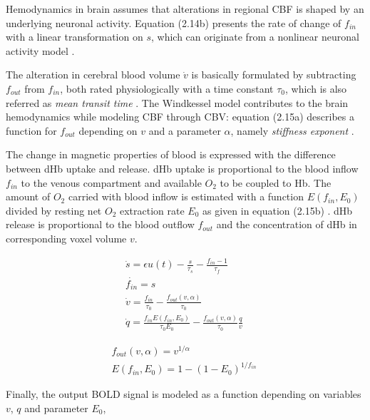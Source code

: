 Hemodynamics in brain assumes that alterations in regional CBF is shaped by an underlying neuronal activity. Equation (2.14b) presents the rate of change of $f_{in}$ with a linear transformation on $s$, which can originate from a nonlinear neuronal activity model \citep{XYZ00, XYZFR}. 

The alteration in cerebral blood volume $\dot{v}$ is basically formulated by subtracting $f_{out}$ from $f_{in}$, both rated physiologically with a time constant $\tau_0$, which is also referred as \textit{mean transit time} \citep{XYZ99}. The Windkessel model contributes to the brain hemodynamics while modeling CBF through CBV:  equation (2.15a) describes a function for $f_{out}$ depending on $v$ and a parameter $\alpha$, namely \textit{stiffness exponent} \citep{XYZ99}.    

The change in magnetic properties of blood is expressed with the difference between dHb uptake and release. dHb uptake is proportional to the blood inflow $f_{in}$ to the venous compartment and available $O_2$ to be coupled to Hb. The amount of $O_2$ carried with blood inflow is estimated with a function $E(f_{in}, E_0)$ divided by resting net $O_2$ extraction rate $E_0$ as given in equation (2.15b) \citep{XYZ98}. dHb release is proportional to the blood outflow $f_{out}$ and the concentration of dHb in corresponding voxel volume $v$.     

\begin{subequations}
 \begin{align} \dot{s} = \epsilon u(t)- \frac{s}{\tau_s} - \frac{f_{in} -1 }{\tau_f}  \label{eqn: frobenius 19}\\  \dot{f_{in}} = s
\label{eqn: frobenius 20} \\ \dot{v} = \frac{f_{in}}{\tau_0} - \frac{f_{out}(v, \alpha)}{\tau_0} 
\label{eqn: frobenius 21} \\ \dot{q} = \frac{f_{in} E(f_{in}, E_0)}{\tau_0 E_0}- \frac{f_{out}(v, \alpha)}{\tau_0}  \frac{q}{v}  
\
\end{align} 
\end{subequations}

\begin{subequations}
 \begin{align} f_{out}(v, \alpha) = v^{1/ \alpha}
 \label{eqn: frobenius 22}\\  E(f_{in} , E_0) = 1- (1-E_0)^{1/f_{in}} \
\end{align} 
\end{subequations}

Finally, the output BOLD signal is modeled as a function depending on variables $v$, $q$ and parameter $E_0$,  

